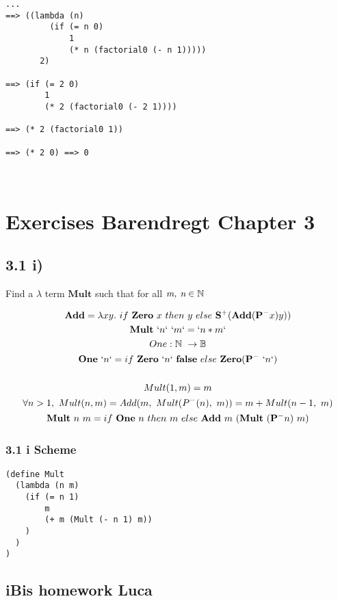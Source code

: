 \documentclass[11pt]{article}
\begin{document}
\begin{verbatim}
...
==> ((lambda (n)
         (if (= n 0)
             1
             (* n (factorial0 (- n 1)))))
       2)
       
==> (if (= 2 0)
        1
        (* 2 (factorial0 (- 2 1))))
        
==> (* 2 (factorial0 1))
             
==> (* 2 0) ==> 0

       
\end{verbatim} 


\section*{Exercises Barendregt Chapter 3}
\subsection*{3.1 i)}
Find a $\lambda$ term $\mathbf{Mult}$ such that for all $\emph{m, n} \in \mathbb{N}$

\begin{gather*}
\mathbf{Add} = \lambda xy.\ if\ \mathbf{Zero}\ x\ then\ y\ else\ \mathbf{S^+}(\mathbf{Add} (\mathbf{P^-}x)y)) \\
\mathbf{Mult}\ `n`\ `m` = `n * m` \\
One : \mathbb{N}\ \rightarrow \mathbb{B} \\
\mathbf{One}\ `n` = if\ \mathbf{Zero}\ `n`\ \mathbf{false}\ else\ \mathbf{Zero}(\mathbf{P^-}\ `n`) \\
\\
Mult(1, m) = m \\
\forall n>1,\ Mult(n, m) = Add (m,\ Mult (P^- (n),\ m)) = m + Mult (n-1,\ m) \\
\mathbf{Mult}\ n\ m = if\ \mathbf{One}\ n\ then\ m\ else\ \mathbf{Add}\ m\ (\mathbf{Mult}\ (\mathbf{P^-} n)\ m)
\end{gather*}

\subsubsection*{ 3.1 i Scheme}
\begin{verbatim}
(define Mult
  (lambda (n m)
    (if (= n 1)
        m
        (+ m (Mult (- n 1) m))
    )
  )
)
\end{verbatim}


\subsection*{iBis homework Luca}
\end{document}
